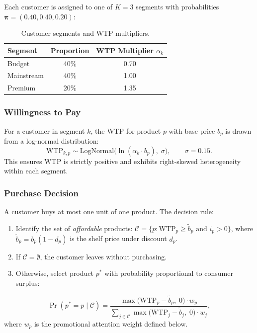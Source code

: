 \documentclass[11pt,a4paper]{article}
\begin{document}
Each customer is assigned to one of $K=3$ segments with probabilities $\bm{\pi} = (0.40, 0.40, 0.20)$:

\begin{table}[H]
\centering
\caption{Customer segments and WTP multipliers.}
\begin{tabular}{@{}lcc@{}}
\toprule
\textbf{Segment} & \textbf{Proportion} & \textbf{WTP Multiplier} $\alpha_k$ \\
\midrule
Budget & 40\% & 0.70 \\
Mainstream & 40\% & 1.00 \\
Premium & 20\% & 1.35 \\
\bottomrule
\end{tabular}
\end{table}

\subsubsection{Willingness to Pay}

For a customer in segment $k$, the WTP for product $p$ with base price $b_p$ is drawn from a log-normal distribution:
\begin{equation}
\mathrm{WTP}_{k,p} \sim \mathrm{LogNormal}\bigl(\ln(\alpha_k \cdot b_p),\; \sigma\bigr),
\qquad \sigma = 0.15.
\end{equation}
This ensures WTP is strictly positive and exhibits right-skewed heterogeneity within each segment.

\subsubsection{Purchase Decision}

A customer buys at most one unit of one product. The decision rule:
\begin{enumerate}
    \item Identify the set of \emph{affordable} products: $\mathcal{C} = \{p : \mathrm{WTP}_p \geq \tilde{b}_p \text{ and } i_p > 0\}$, where $\tilde{b}_p = b_p(1-d_p)$ is the shelf price under discount $d_p$.
    \item If $\mathcal{C} = \emptyset$, the customer leaves without purchasing.
    \item Otherwise, select product $p^*$ with probability proportional to consumer surplus:
\end{enumerate}
\begin{equation}
\Pr(p^* = p \mid \mathcal{C}) = \frac{\max\bigl(\mathrm{WTP}_p - \tilde{b}_p,\; 0\bigr) \cdot w_p}{\sum_{j \in \mathcal{C}} \max\bigl(\mathrm{WTP}_j - \tilde{b}_j,\; 0\bigr) \cdot w_j},
\end{equation}
where $w_p$ is the promotional attention weight defined below.
\end{document}
